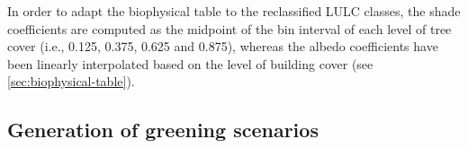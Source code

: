 \documentclass[12pt]{iopart}
\begin{document}
In order to adapt the biophysical table to the reclassified LULC classes, the shade coefficients are computed as the midpoint of the bin interval of each level of tree cover (i.e., 0.125, 0.375, 0.625 and 0.875), whereas the albedo coefficients have been linearly interpolated based on the level of building cover (see \ref{sec:biophysical-table}).









\subsection{Generation of greening scenarios}
\end{document}
